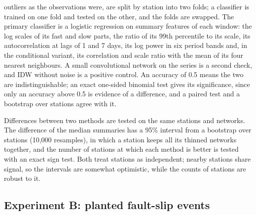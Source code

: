 \documentclass[preprint,12pt,authoryear]{elsarticle}
\begin{document}
\begin{description}
    outliers as the observations were, are split by station into two folds; a classifier
    is trained on one fold and tested on the other, and the folds are swapped. The
    primary classifier is a logistic regression on summary features of each window: the
    log scales of its fast and slow parts, the ratio of its 99th percentile to its scale,
    its autocorrelation at lags of 1 and 7 days, its log power in six period bands and,
    in the conditional variant, its correlation and scale ratio with the mean of its four
    nearest neighbours. A small convolutional network on the series is a second check,
    and IDW without noise is a positive control. An accuracy of 0.5 means the two are
    indistinguishable; an exact one-sided binomial test gives its significance, since only
    an accuracy above 0.5 is evidence of a difference, and a paired test
    and a bootstrap over stations agree with it.
\end{description}
Differences between two methods are tested on the same stations and networks. The
difference of the median summaries has a 95\% interval from a bootstrap over stations
(10,000 resamples), in which a station keeps all its thinned networks together, and the
number of stations at which each method is better is tested with an exact sign test. Both
treat stations as independent; nearby stations share signal, so the intervals are
somewhat optimistic, while the counts of stations are robust to it.

\subsection{Experiment B: planted fault-slip events}
\end{document}
